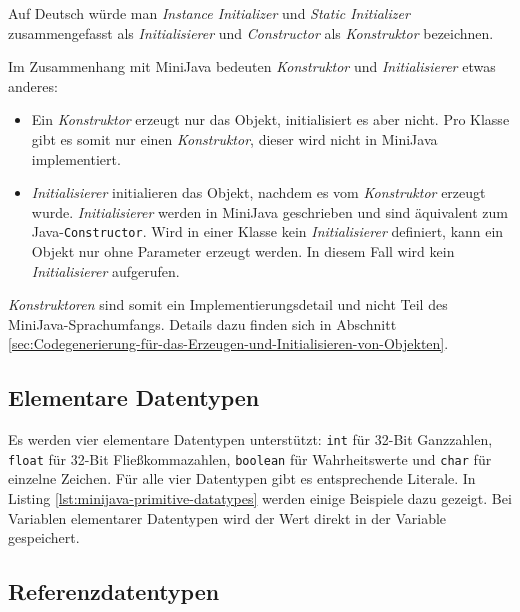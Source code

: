 

Auf Deutsch würde man \emph{Instance Initializer} und \emph{Static Initializer} zusammengefasst als \emph{Initialisierer} und \emph{Constructor} als \emph{Konstruktor} bezeichnen.

Im Zusammenhang mit MiniJava bedeuten \emph{Konstruktor} und \emph{Initialisierer} etwas anderes:
\begin{itemize}
    \item Ein \emph{Konstruktor} erzeugt nur das Objekt, initialisiert es aber nicht. Pro Klasse gibt es somit nur einen \emph{Konstruktor}, dieser wird nicht in MiniJava implementiert. 
    \item \emph{Initialisierer} initialieren das Objekt, nachdem es vom \emph{Konstruktor} erzeugt wurde. \emph{Initialisierer} werden in MiniJava geschrieben und sind äquivalent zum Java-\lstinline{Constructor}. Wird in einer Klasse kein \emph{Initialisierer} definiert, kann ein Objekt nur ohne Parameter erzeugt werden. In diesem Fall wird kein \emph{Initialisierer} aufgerufen.
\end{itemize}

\emph{Konstruktoren} sind somit ein Implementierungsdetail und nicht Teil des MiniJava-Sprachumfangs. Details dazu finden sich in Abschnitt \ref{sec:Codegenerierung-für-das-Erzeugen-und-Initialisieren-von-Objekten}.

\subsection{Elementare Datentypen}

Es werden vier elementare Datentypen unterstützt: \lstinline{int} für 32-Bit Ganzzahlen, \lstinline{float} für 32-Bit Fließkommazahlen, \lstinline{boolean} für Wahrheitswerte und \lstinline{char} für einzelne Zeichen. Für alle vier Datentypen gibt es entsprechende Literale. In Listing \ref{lst:minijava-primitive-datatypes} werden einige Beispiele dazu gezeigt. Bei Variablen elementarer Datentypen wird der Wert direkt in der Variable gespeichert.

\pagebreak


\subsection{Referenzdatentypen}

